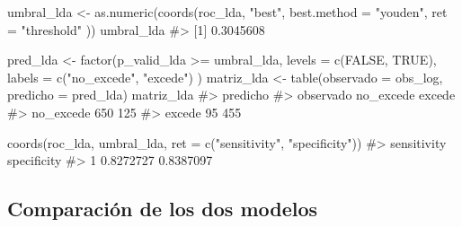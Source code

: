 \documentclass[
  spanish,
  letterpaper,
  DIV=11,
  numbers=noendperiod]{scrartcl}
\newenvironment{Shaded}{\begin{snugshade}}{\end{snugshade}}
\newcommand{\AttributeTok}[1]{\textcolor[rgb]{0.40,0.45,0.13}{#1}}
\newcommand{\CommentTok}[1]{\textcolor[rgb]{0.37,0.37,0.37}{#1}}
\newcommand{\ConstantTok}[1]{\textcolor[rgb]{0.56,0.35,0.01}{#1}}
\newcommand{\FunctionTok}[1]{\textcolor[rgb]{0.28,0.35,0.67}{#1}}
\newcommand{\NormalTok}[1]{\textcolor[rgb]{0.00,0.23,0.31}{#1}}
\newcommand{\OtherTok}[1]{\textcolor[rgb]{0.00,0.23,0.31}{#1}}
\newcommand{\SpecialCharTok}[1]{\textcolor[rgb]{0.37,0.37,0.37}{#1}}
\newcommand{\StringTok}[1]{\textcolor[rgb]{0.13,0.47,0.30}{#1}}
\begin{document}
\begin{Shaded}
\begin{Highlighting}[]
\NormalTok{umbral\_lda }\OtherTok{\textless{}{-}} \FunctionTok{as.numeric}\NormalTok{(}\FunctionTok{coords}\NormalTok{(roc\_lda, }\StringTok{"best"}\NormalTok{,}
    \AttributeTok{best.method =} \StringTok{"youden"}\NormalTok{,}
    \AttributeTok{ret =} \StringTok{"threshold"}
\NormalTok{))}
\NormalTok{umbral\_lda}
\CommentTok{\#\textgreater{} [1] 0.3045608}

\NormalTok{pred\_lda }\OtherTok{\textless{}{-}} \FunctionTok{factor}\NormalTok{(p\_valid\_lda }\SpecialCharTok{\textgreater{}=}\NormalTok{ umbral\_lda,}
    \AttributeTok{levels =} \FunctionTok{c}\NormalTok{(}\ConstantTok{FALSE}\NormalTok{, }\ConstantTok{TRUE}\NormalTok{),}
    \AttributeTok{labels =} \FunctionTok{c}\NormalTok{(}\StringTok{"no\_excede"}\NormalTok{, }\StringTok{"excede"}\NormalTok{)}
\NormalTok{)}
\NormalTok{matriz\_lda }\OtherTok{\textless{}{-}} \FunctionTok{table}\NormalTok{(}\AttributeTok{observado =}\NormalTok{ obs\_log, }\AttributeTok{predicho =}\NormalTok{ pred\_lda)}
\NormalTok{matriz\_lda}
\CommentTok{\#\textgreater{}            predicho}
\CommentTok{\#\textgreater{} observado   no\_excede excede}
\CommentTok{\#\textgreater{}   no\_excede       650    125}
\CommentTok{\#\textgreater{}   excede           95    455}

\FunctionTok{coords}\NormalTok{(roc\_lda, umbral\_lda, }\AttributeTok{ret =} \FunctionTok{c}\NormalTok{(}\StringTok{"sensitivity"}\NormalTok{, }\StringTok{"specificity"}\NormalTok{))}
\CommentTok{\#\textgreater{}   sensitivity specificity}
\CommentTok{\#\textgreater{} 1   0.8272727   0.8387097}
\end{Highlighting}
\end{Shaded}

\subsection{Comparación de los dos
modelos}\label{comparaciuxf3n-de-los-dos-modelos}
\end{document}
